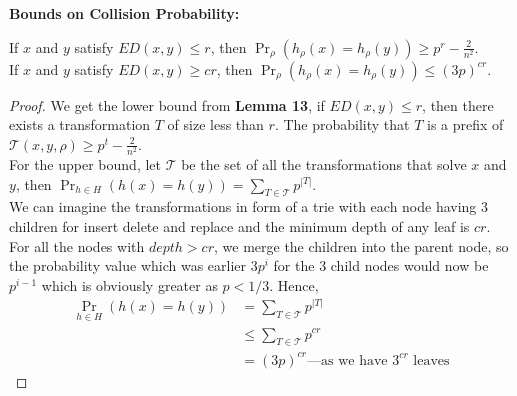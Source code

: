 \documentclass{article}
\begin{document}
\textbf{Bounds on Collision Probability:}
\begin{lem}
    If $x$ and $y$ satisfy $ED(x,y)\leq r$, then $\Pr_\rho(h_\rho(x)=h_\rho(y))
    \geq p^r-\frac{2}{n^2}$.\\
    If $x$ and $y$ satisfy $ED(x,y)\geq cr$, then $\Pr_\rho(h_\rho(x)=h_\rho(y))
    \leq (3p)^{cr}$.
\end{lem}
\begin{proof}
    We get the lower bound from \textbf{Lemma 13}, if $ED(x,y)\leq r$, then there
    exists a transformation $T$ of size less than $r$. The probability that 
    $T$ is a prefix of $\mathcal{T}(x,y,\rho)\geq p^t-\frac{2}{n^2}$.\\
    For the upper bound, let $\mathcal{T}$ be the set of all the transformations that 
    solve $x$ and $y$, then $\Pr_{h\in H}(h(x)=h(y))=\sum_{T\in\mathcal{T}}^{}p^{|T|}$.\\
    We can imagine the transformations in form of a trie with each node having 3 
    children for insert delete and replace and the minimum depth of any leaf is 
    $cr$.\\
    For all the nodes with $depth>cr$, we merge the children into the parent node,
    so the probability value which was earlier $3p^i$ for the 3 child nodes would 
    now be $p^{i-1}$ which is obviously greater as $p<1/3$. Hence,
    \begin{align}
        \Pr_{h\in H}(h(x)=h(y))&=\sum_{T\in\mathcal{T}}^{}p^{|T|}\nonumber\\
        &\leq \sum_{T\in\mathcal{T}}^{}p^{cr}\nonumber\\
        &=(3p)^{cr}\text{---as we have }3^{cr}\text{ leaves}\nonumber
    \end{align}
\end{proof}



\end{document}
